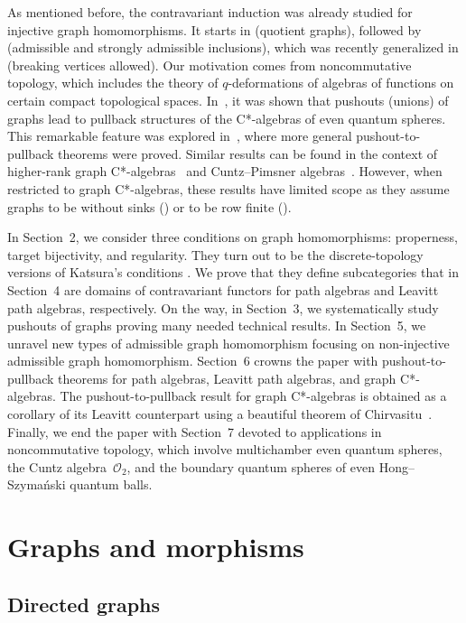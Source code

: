 \documentclass[12pt,times,a4paper]{amsart}
\numberwithin{equation}{section}
\numberwithin{equation}{section}
\begin{document}
As mentioned before, 
the contravariant induction  was already studied for injective graph homomorphisms. It starts in \cite[Definition~2.4.11]{aasm17}
(quotient graphs), followed by \cite{hrt20} (admissible and strongly admissible inclusions), which was recently generalized in
\cite{bs22} (breaking vertices allowed).  Our motivation comes from noncommutative topology, which includes the theory of 
\mbox{$q$-de}\-formations of 
algebras of functions on certain compact topological spaces. In~\cite{hs08}, it was shown that pushouts (unions) of graphs lead to pullback structures of the C*-algebras of even quantum
spheres. This remarkable feature was explored in~\cite{hrt20,bs22}, where 
more general pushout-to-pullback theorems were proved. Similar results can be found in the context of higher-rank graph 
C*-algebras~\cite{kpsw16} and Cuntz--Pimsner algebras~\cite{rs11}. However, when restricted to graph C*-algebras, these results
have  limited scope as they assume graphs to be without sinks (\cite{kpsw16}) or to be row finite (\cite{rs11}).

In Section~2, we consider three conditions on graph homomorphisms: properness, target bijectivity, and regularity. They turn out
to be the discrete-topology versions of Katsura's conditions \cite[Definition~2.1 and Definition~2.6]{t-k06}. We
prove that they define subcategories that in Section~4 are domains of contravariant functors for path algebras and Leavitt
path algebras, respectively. On the way, in Section~3, we systematically study pushouts of graphs proving many needed
technical results. In Section~5, we unravel new types of admissible graph homomorphism focusing on
non-injective admissible graph homomorphism.
Section~6 crowns the paper with pushout-to-pullback theorems for path algebras, Leavitt path algebras,
and graph C*-algebras. The pushout-to-pullback result for graph C*-algebras is obtained as a corollary of its Leavitt
counterpart using a beautiful theorem of Chirvasitu~\cite{a-c22}. 
Finally, we end the paper with Section~7 devoted to applications in noncommutative
topology, which involve multichamber even quantum spheres,  the Cuntz algebra~$\mathcal{O}_2$, and the
boundary quantum spheres of even Hong--Szyma\'nski quantum balls.


\section{Graphs and morphisms}

\subsection{Directed graphs}
\end{document}

